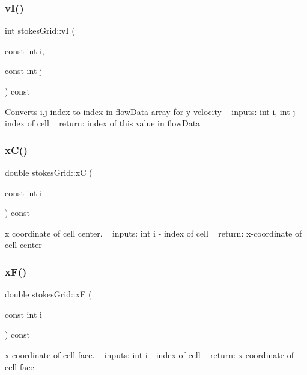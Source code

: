 \subsubsection{\texorpdfstring{v\+I()}{vI()}}
{\footnotesize\ttfamily int stokes\+Grid\+::vI (\begin{DoxyParamCaption}\item[{const int}]{i,  }\item[{const int}]{j }\end{DoxyParamCaption}) const}

Converts i,j index to index in flow\+Data array for y-\/velocity ~\newline
inputs\+: int i, int j -\/ index of cell ~\newline
return\+: index of this value in flow\+Data \mbox{\label{classstokesGrid_a7d0a12c2c2b992e277e5c647e9c043c4}} 
\subsubsection{\texorpdfstring{x\+C()}{xC()}}
{\footnotesize\ttfamily double stokes\+Grid\+::xC (\begin{DoxyParamCaption}\item[{const int}]{i }\end{DoxyParamCaption}) const}

x coordinate of cell center. ~\newline
inputs\+: int i -\/ index of cell ~\newline
return\+: x-\/coordinate of cell center \mbox{\label{classstokesGrid_ad913a3af47df559178ed3cd040c6522e}} 
\subsubsection{\texorpdfstring{x\+F()}{xF()}}
{\footnotesize\ttfamily double stokes\+Grid\+::xF (\begin{DoxyParamCaption}\item[{const int}]{i }\end{DoxyParamCaption}) const}

x coordinate of cell face. ~\newline
inputs\+: int i -\/ index of cell ~\newline
return\+: x-\/coordinate of cell face \mbox{\label{classstokesGrid_af4abd0b7372a6fad8b14ce8770a8e31a}} 
